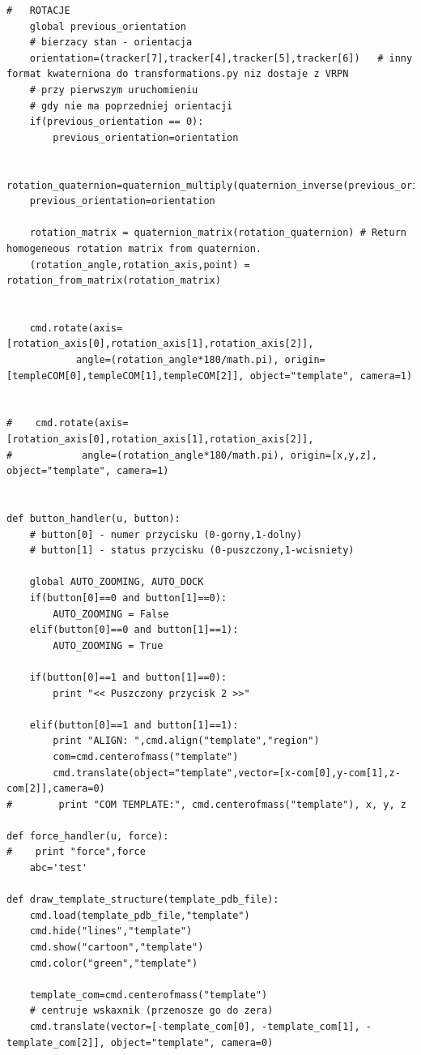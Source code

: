 \documentclass[licencjacka]{pracamgr}
\begin{document}
\begin{lstlisting}
#   ROTACJE 
    global previous_orientation
    # bierzacy stan - orientacja
    orientation=(tracker[7],tracker[4],tracker[5],tracker[6])   # inny format kwaterniona do transformations.py niz dostaje z VRPN
    # przy pierwszym uruchomieniu 
    # gdy nie ma poprzedniej orientacji 
    if(previous_orientation == 0):
        previous_orientation=orientation

    rotation_quaternion=quaternion_multiply(quaternion_inverse(previous_orientation),orientation)
    previous_orientation=orientation
    
    rotation_matrix = quaternion_matrix(rotation_quaternion) # Return homogeneous rotation matrix from quaternion.
    (rotation_angle,rotation_axis,point) = rotation_from_matrix(rotation_matrix)


    cmd.rotate(axis=[rotation_axis[0],rotation_axis[1],rotation_axis[2]], 
            angle=(rotation_angle*180/math.pi), origin=[templeCOM[0],templeCOM[1],templeCOM[2]], object="template", camera=1)


#    cmd.rotate(axis=[rotation_axis[0],rotation_axis[1],rotation_axis[2]], 
#            angle=(rotation_angle*180/math.pi), origin=[x,y,z], object="template", camera=1)


def button_handler(u, button):
    # button[0] - numer przycisku (0-gorny,1-dolny)
    # button[1] - status przycisku (0-puszczony,1-wcisniety)
    
    global AUTO_ZOOMING, AUTO_DOCK
    if(button[0]==0 and button[1]==0):
        AUTO_ZOOMING = False
    elif(button[0]==0 and button[1]==1):
        AUTO_ZOOMING = True
        
    if(button[0]==1 and button[1]==0):
        print "<< Puszczony przycisk 2 >>"
        
    elif(button[0]==1 and button[1]==1):
        print "ALIGN: ",cmd.align("template","region")
        com=cmd.centerofmass("template")
        cmd.translate(object="template",vector=[x-com[0],y-com[1],z-com[2]],camera=0)
#        print "COM TEMPLATE:", cmd.centerofmass("template"), x, y, z
        
def force_handler(u, force):
#    print "force",force
    abc='test'
    
def draw_template_structure(template_pdb_file):
    cmd.load(template_pdb_file,"template")
    cmd.hide("lines","template")
    cmd.show("cartoon","template")
    cmd.color("green","template")
    
    template_com=cmd.centerofmass("template")
    # centruje wskaxnik (przenosze go do zera)
    cmd.translate(vector=[-template_com[0], -template_com[1], -template_com[2]], object="template", camera=0)
    

\end{lstlisting}
\end{document}
